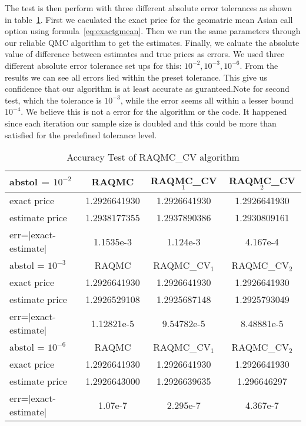The test is then perform with three different absolute error tolerances as shown in table~\ref{tb:accuracy}.
First we caculated the exact price for the geomatric mean Asian call option using formula~\eqref{eq:exactgmean}. 
Then we run the same parameters through our reliable QMC algorithm to get the estimates. 
Finally, we caluate the absolute value of difference between estimates and true prices as errors. 
We used three different absolute error tolerance set ups for this: $10^{-2}, 10^{-3}, 10^{-6}$.   
From the results we can see all errors lied within the preset tolerance. 
This give us confidence that our algorithm is at least accurate as guranteed.Note for second test, which the tolerance is $10^{-3}$, while the error seems all within a lesser bound $10^{-4}$. 
We believe this is not a error for the algorithm or the code.  
It happened since each iteration our sample size is doubled and this could be more than satisfied for the predefined tolerance level.
\begin{table}[h]
    \label{tb:accuracy}
    \centering
	\caption{Accuracy Test of RAQMC\_CV algorithm}
    \begin{tabular}{lccc}  
    \hline \hline
    abstol = $10^{-2}$ &RAQMC&RAQMC\_CV$_1$&RAQMC\_CV$_2$\\[0.5ex]
    \hline
    exact price& 1.2926641930& 1.2926641930&1.2926641930\\[0.5ex]
    estimate price& 1.2938177355& 1.2937890386&1.2930809161\\[0.5ex]
    err=$|$exact-estimate$|$ & 1.1535e-3& 1.124e-3&4.167e-4\\[0.5ex]
    \hline
    abstol = $10^{-3}$ &RAQMC&RAQMC\_CV$_1$&RAQMC\_CV$_2$\\[0.5ex]
    \hline
    exact price& 1.2926641930& 1.2926641930&1.2926641930\\[0.5ex]
    estimate price& 1.2926529108& 1.2925687148&1.2925793049\\[0.5ex]
    err=$|$exact-estimate$|$ & 1.12821e-5& 9.54782e-5&8.48881e-5\\[0.5ex]
    \hline
    abstol = $10^{-6}$ & RAQMC&RAQMC\_CV$_1$&RAQMC\_CV$_2$\\[0.5ex]
    \hline
    exact price& 1.2926641930& 1.2926641930&1.2926641930\\[0.5ex]
    estimate price& 1.2926643000& 1.2926639635&1.296646297\\[0.5ex]
    err=$|$exact-estimate$|$ & 1.07e-7& 2.295e-7&4.367e-7\\[0.5ex]
    \hline
    \end{tabular}
\end{table}



